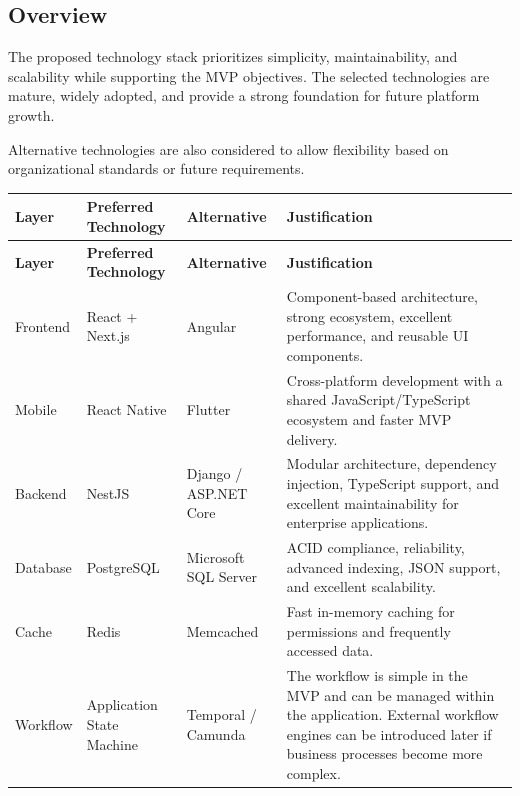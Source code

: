 \documentclass[11pt]{article}
\begin{document}
\subsection{Overview}

The proposed technology stack prioritizes simplicity, maintainability, and
scalability while supporting the MVP objectives. The selected technologies are
mature, widely adopted, and provide a strong foundation for future platform
growth.

Alternative technologies are also considered to allow flexibility based on
organizational standards or future requirements.

\begingroup
\small
\renewcommand{\arraystretch}{1.2}
\setlength{\tabcolsep}{4pt}
\begin{longtable}{|>{\raggedright\arraybackslash}p{}|>{\raggedright\arraybackslash}p{}|>{\raggedright\arraybackslash}p{}|>{\raggedright\arraybackslash}p{}|}
    \hline
    \textbf{Layer} & \textbf{Preferred Technology} & \textbf{Alternative} & \textbf{Justification} \\
    \hline
    \endfirsthead
    \hline
    \textbf{Layer} & \textbf{Preferred Technology} & \textbf{Alternative} & \textbf{Justification} \\
    \hline
    \endhead
    Frontend & React + Next.js & Angular & Component-based architecture,
    strong ecosystem, excellent performance, and reusable UI components. \\
    \hline
    Mobile & React Native & Flutter & Cross-platform development with a
    shared JavaScript/TypeScript ecosystem and faster MVP delivery. \\
    \hline
    Backend & NestJS & Django / ASP.NET Core & Modular architecture,
    dependency injection, TypeScript support, and excellent maintainability
    for enterprise applications. \\
    \hline
    Database & PostgreSQL & Microsoft SQL Server & ACID compliance,
    reliability, advanced indexing, JSON support, and excellent scalability. \\
    \hline
    Cache & Redis & Memcached & Fast in-memory caching for permissions and
    frequently accessed data. \\
    \hline
    Workflow & Application State Machine & Temporal / Camunda & The workflow
    is simple in the MVP and can be managed within the application. External
    workflow engines can be introduced later if business processes become more
    complex. \\

\end{longtable}
\end{document}
